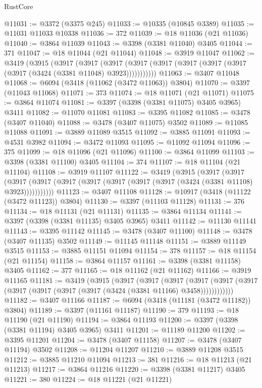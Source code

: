 \begin{lexlean}{RustCore}
\begin{coremodule}
@11031 := @3372 (@3375 @245)
@11033 := @10335 (@10845 @3389)
@11035 := @11031 @11033 @10338
@11036 := 372
@11039 := @18 @11036 (@21 @11036)
@11040 := @3864 @11039
@11043 := @3398 (@3381 @11040) @3405
@11044 := 371
@11047 := @18 @11044 (@21 @11044)
@11048 := @3919 @11047
@11062 := @3419
    (@3915
      (@3917
        (@3917
          (@3917 (@3917 (@3917 (@3917 (@3917 (@3917 (@3917 (@3424 (@3381 @11048) @3923)))))))))))
@11063 := @3407 @11048
@11068 := @6094 (@3418 (@11062 (@3472 @11063)) @3804)
@11070 := @3397 (@11043 @11068)
@11071 := 373
@11074 := @18 @11071 (@21 @11071)
@11075 := @3864 @11074
@11081 := @3397 (@3398 (@3381 @11075) @3405 @3965) @3411
@11082 := @11070 @11081
@11083 := @3395 @11082
@11085 := @3478 (@3407 @11040)
@11088 := @3478 (@3407 @11075) @3502
@11089 := @11085 @11088
@11091 := @3889 @11089 @3515
@11092 := @3885 @11091
@11093 := @4531 @3982
@11094 := @3472 @11093
@11095 := @11092 @11094
@11096 := 375
@11099 := @18 @11096 (@21 @11096)
@11100 := @3864 @11099
@11103 := @3398 (@3381 @11100) @3405
@11104 := 374
@11107 := @18 @11104 (@21 @11104)
@11108 := @3919 @11107
@11122 := @3419
    (@3915
      (@3917
        (@3917
          (@3917 (@3917 (@3917 (@3917 (@3917 (@3917 (@3917 (@3424 (@3381 @11108) @3923)))))))))))
@11123 := @3407 @11108
@11128 := @10917 (@3418 (@11122 (@3472 @11123)) @3804)
@11130 := @3397 (@11103 @11128)
@11131 := 376
@11134 := @18 @11131 (@21 @11131)
@11135 := @3864 @11134
@11141 := @3397 (@3398 (@3381 @11135) @3405 @3965) @3411
@11142 := @11130 @11141
@11143 := @3395 @11142
@11145 := @3478 (@3407 @11100)
@11148 := @3478 (@3407 @11135) @3502
@11149 := @11145 @11148
@11151 := @3889 @11149 @3515
@11153 := @3885 @11151 @11094
@11154 := 378
@11157 := @18 @11154 (@21 @11154)
@11158 := @3864 @11157
@11161 := @3398 (@3381 @11158) @3405
@11162 := 377
@11165 := @18 @11162 (@21 @11162)
@11166 := @3919 @11165
@11181 := @3419
    (@3915
      (@3917
        (@3917
          (@3917
            (@3917 (@3917 (@3917 (@3917 (@3917 (@3917 (@3917 (@3424 (@3381 @11166) @3458))))))))))))
@11182 := @3407 @11166
@11187 := @6094 (@3418 (@11181 (@3472 @11182)) @3804)
@11189 := @3397 (@11161 @11187)
@11190 := 379
@11193 := @18 @11190 (@21 @11190)
@11194 := @3864 @11193
@11200 := @3397 (@3398 (@3381 @11194) @3405 @3965) @3411
@11201 := @11189 @11200
@11202 := @3395 @11201
@11204 := @3478 (@3407 @11158)
@11207 := @3478 (@3407 @11194) @3502
@11208 := @11204 @11207
@11210 := @3889 @11208 @3515
@11212 := @3885 @11210 @11094
@11213 := 381
@11216 := @18 @11213 (@21 @11213)
@11217 := @3864 @11216
@11220 := @3398 (@3381 @11217) @3405
@11221 := 380
@11224 := @18 @11221 (@21 @11221)

\end{coremodule}
\end{lexlean}
